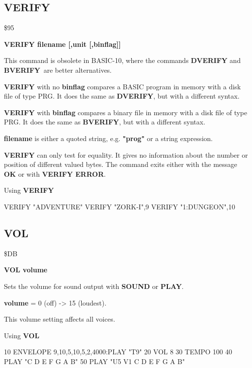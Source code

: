 \subsection{VERIFY}
\begin{description}[leftmargin=3cm,style=nextline]
\item [Token:] \$95
\item [Format:] {\bf VERIFY filename [,unit [,binflag]] }
\item [Usage:]
   This command is obsolete in BASIC-10, where the commands
   {\bf DVERIFY} and {\bf BVERIFY} are better alternatives.

   {\bf VERIFY} with no {\bf binflag} compares a BASIC program
   in memory with a disk file of type PRG.
   It does the same as {\bf DVERIFY}, but with a different syntax.

   {\bf VERIFY} with {\bf binflag} compares a binary file
   in memory with a disk file of type PRG.
   It does the same as {\bf BVERIFY}, but with a different syntax.

   {\bf filename} is either a quoted string, e.g. {\bf "prog"} or
   a string expression.

   \unitdefinition

\item [Remarks:]
   {\bf VERIFY} can only test for equality. It gives no information
   about the number or position of different valued bytes.
   The command exits either with the message {\bf OK}
   or with {\bf VERIFY ERROR}.

\item [Example:] Using {\bf VERIFY}
\begin{screenoutput}
  VERIFY "ADVENTURE"
  VERIFY "ZORK-I",9
  VERIFY "1:DUNGEON",10
\end{screenoutput}
\end{description}


\newpage
\subsection{VOL}
\begin{description}[leftmargin=3cm,style=nextline]
\item [Token:] \$DB
\item [Format:] {\bf VOL volume}
\item [Usage:] Sets the volume for sound output with
               {\bf SOUND} or {\bf PLAY}.

               {\bf volume} = 0 (off) -> 15 (loudest).

\item [Remarks:] This volume setting affects all voices.

\item [Example:] Using {\bf VOL}
\begin{screenoutput}
10 ENVELOPE 9,10,5,10,5,2,4000:PLAY "T9"
20 VOL 8
30 TEMPO 100
40 PLAY "C D E F G A B"
50 PLAY "U5 V1 C D E F G A B"
\end{screenoutput}
\end{description}

